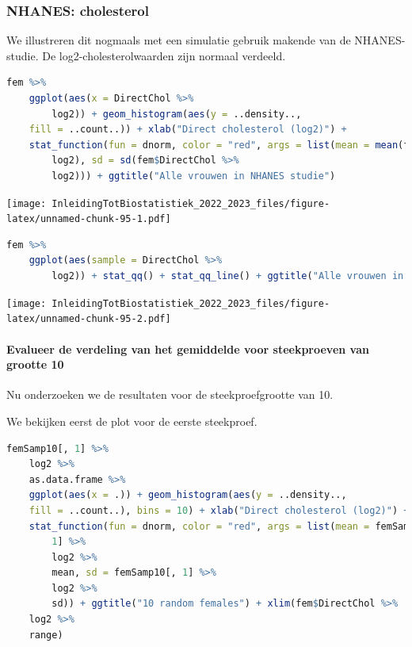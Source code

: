 \documentclass[
  12pt,dutch,coursenotes]{book}
\begin{document}
\hypertarget{nhanes-cholesterol}{%
\subsubsection{NHANES: cholesterol}\label{nhanes-cholesterol}}

We illustreren dit nogmaals met een simulatie gebruik makende van de NHANES-studie.
De log2-cholesterolwaarden zijn normaal verdeeld.

\begin{lstlisting}[language=R]
fem %>%
    ggplot(aes(x = DirectChol %>%
        log2)) + geom_histogram(aes(y = ..density..,
    fill = ..count..)) + xlab("Direct cholesterol (log2)") +
    stat_function(fun = dnorm, color = "red", args = list(mean = mean(fem$DirectChol %>%
        log2), sd = sd(fem$DirectChol %>%
        log2))) + ggtitle("Alle vrouwen in NHANES studie")
\end{lstlisting}

\texttt{[image: InleidingTotBiostatistiek\_2022\_2023\_files/figure-latex/unnamed-chunk-95-1.pdf]}

\begin{lstlisting}[language=R]
fem %>%
    ggplot(aes(sample = DirectChol %>%
        log2)) + stat_qq() + stat_qq_line() + ggtitle("Alle vrouwen in NHANES study")
\end{lstlisting}

\texttt{[image: InleidingTotBiostatistiek\_2022\_2023\_files/figure-latex/unnamed-chunk-95-2.pdf]}

\hypertarget{evalueer-de-verdeling-van-het-gemiddelde-voor-steekproeven-van-grootte-10}{%
\paragraph{Evalueer de verdeling van het gemiddelde voor steekproeven van grootte 10}\label{evalueer-de-verdeling-van-het-gemiddelde-voor-steekproeven-van-grootte-10}}

Nu onderzoeken we de resultaten voor de steekproefgrootte van 10.

We bekijken eerst de plot voor de eerste steekproef.

\begin{lstlisting}[language=R]
femSamp10[, 1] %>%
    log2 %>%
    as.data.frame %>%
    ggplot(aes(x = .)) + geom_histogram(aes(y = ..density..,
    fill = ..count..), bins = 10) + xlab("Direct cholesterol (log2)") +
    stat_function(fun = dnorm, color = "red", args = list(mean = femSamp10[,
        1] %>%
        log2 %>%
        mean, sd = femSamp10[, 1] %>%
        log2 %>%
        sd)) + ggtitle("10 random females") + xlim(fem$DirectChol %>%
    log2 %>%
    range)
\end{lstlisting}
\end{document}
